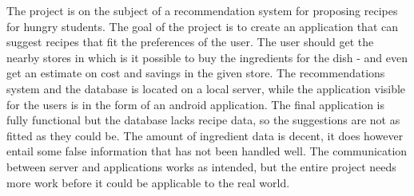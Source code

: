 
The project is on the subject of a recommendation system for proposing recipes for hungry students. The goal of the project is to create an application that can suggest recipes that fit the preferences of the user. The user should get the nearby stores in which is it possible to buy the ingredients for the dish - and even get an estimate on cost and savings in the given store. The recommendations system and the database is located on a local server, while the application visible for the users is in the form of an android application. The final application is fully functional but the database lacks recipe data, so the suggestions are not as fitted as they could be. The amount of ingredient data is decent, it does however entail some false information that has not been handled well. The communication between server and applications works as intended, but the entire project needs more work before it could be applicable to the real world.